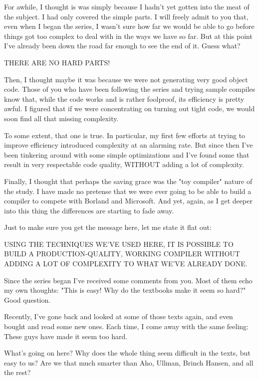 For awhile, I thought  is  was simply because I hadn't yet gotten into the meat  of  the  subject. I had only covered the simple parts. I will freely admit  to  you  that, even when I began the series, I  wasn't  sure how far we would be able  to  go  before things got too complex to deal with in the ways  we  have so far. But at this point I've already  been  down the road far enough to see the end of it. Guess what?

THERE ARE NO HARD PARTS!

Then, I thought maybe it was because we were not  generating very good object  code. Those  of  you  who have been following the series and trying sample compiles know that, while the code works and  is  rather  foolproof, its  efficiency is pretty awful. I figured that if we were  concentrating on turning out tight code, we would soon find all that missing complexity.

To  some  extent, that one is true. In particular, my first few efforts at trying to improve efficiency introduced  complexity at an alarming rate. But since then I've been tinkering around with some simple optimizations and I've found some that result in very respectable code quality, WITHOUT adding a lot of complexity.

Finally, I thought that  perhaps  the  saving  grace was the "toy compiler" nature of the study. I  have made no pretense that we were  ever  going  to be able to build a compiler to compete with Borland and Microsoft. And yet, again, as I get deeper into this thing the differences are starting to fade away.

Just  to make sure you get the message here, let me state it flat out:

USING THE TECHNIQUES WE'VE USED  HERE, IT  IS  POSSIBLE TO BUILD A PRODUCTION-QUALITY, WORKING COMPILER WITHOUT ADDING A LOT OF COMPLEXITY TO WHAT WE'VE ALREADY DONE.

Since  the series began I've received  some  comments  from  you. Most of them echo my own thoughts:  "This is easy!    Why  do the textbooks make it seem so hard?"  Good question.

Recently, I've gone back and looked at some of those texts again, and even bought and read some new ones. Each  time, I come away with the same feeling: These guys have made it seem too hard.

What's going on here?  Why does the whole thing seem difficult in the texts, but easy to us?    Are  we that much smarter than Aho, Ullman, Brinch Hansen, and all the rest?

